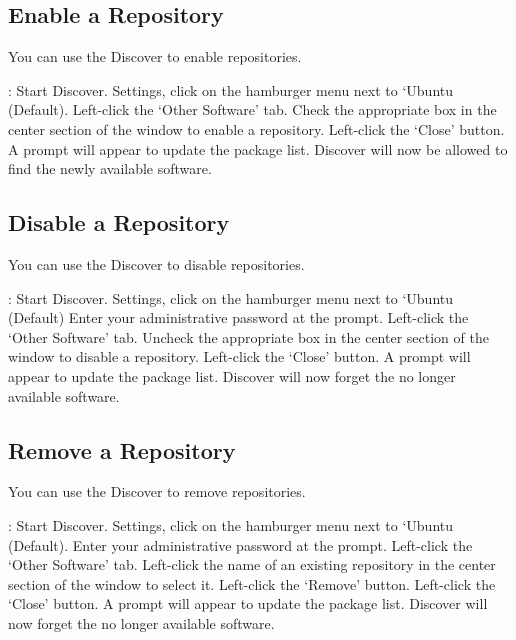 \documentclass[letterpaper,10pt,english]{sphinxmanual}
\begin{document}




\subsection{Enable a Repository}
\label{\detokenize{docs/repositories:enable-a-repository}}
You can use the Discover to enable repositories.

: Start Discover. Settings, click on the hamburger menu next to ‘Ubuntu (Default). Left-click the ‘Other Software’ tab. Check the appropriate box in the center section of the window to enable a repository. Left-click the ‘Close’ button. A prompt will appear to update the package list. Discover will now be allowed to find the newly available software.


\subsection{Disable a Repository}
\label{\detokenize{docs/repositories:disable-a-repository}}
You can use the Discover to disable repositories.

: Start Discover. Settings, click on the hamburger menu next to ‘Ubuntu (Default) Enter your administrative password at the prompt. Left-click the ‘Other Software’ tab. Uncheck the appropriate box in the center section of the window to disable a repository. Left-click the ‘Close’ button. A prompt will appear to update the package list. Discover will now forget the no longer available software.


\subsection{Remove a Repository}
\label{\detokenize{docs/repositories:remove-a-repository}}
You can use the Discover to remove repositories.

: Start Discover. Settings, click on the hamburger menu next to ‘Ubuntu (Default). Enter your administrative password at the prompt. Left-click the ‘Other Software’ tab. Left-click the name of an existing repository in the center section of the window to select it. Left-click the ‘Remove’ button. Left-click the ‘Close’ button. A prompt will appear to update the package list. Discover will now forget the no longer available software.
\end{document}
